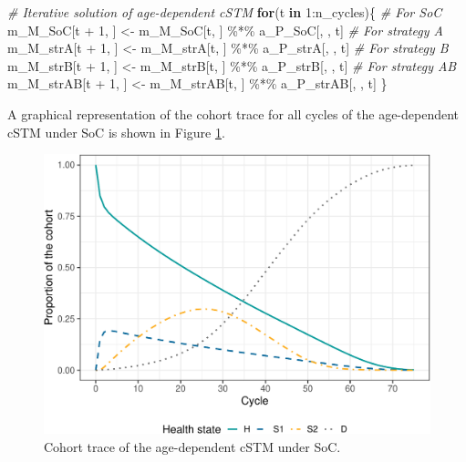 \documentclass[
]{article}
\newenvironment{Shaded}{\begin{snugshade}}{\end{snugshade}}
\newcommand{\CommentTok}[1]{\textcolor[rgb]{0.56,0.35,0.01}{\textit{#1}}}
\newcommand{\ControlFlowTok}[1]{\textcolor[rgb]{0.13,0.29,0.53}{\textbf{#1}}}
\newcommand{\DecValTok}[1]{\textcolor[rgb]{0.00,0.00,0.81}{#1}}
\newcommand{\NormalTok}[1]{#1}
\newcommand{\OtherTok}[1]{\textcolor[rgb]{0.56,0.35,0.01}{#1}}
\newcommand{\SpecialCharTok}[1]{\textcolor[rgb]{0.00,0.00,0.00}{#1}}
\begin{document}
\begin{Shaded}
\begin{Highlighting}[]
\CommentTok{\# Iterative solution of age{-}dependent cSTM}
\ControlFlowTok{for}\NormalTok{(t }\ControlFlowTok{in} \DecValTok{1}\SpecialCharTok{:}\NormalTok{n\_cycles)\{}
  \CommentTok{\# For SoC}
\NormalTok{  m\_M\_SoC[t }\SpecialCharTok{+} \DecValTok{1}\NormalTok{, ] }\OtherTok{\textless{}{-}}\NormalTok{ m\_M\_SoC[t, ] }\SpecialCharTok{\%*\%}\NormalTok{ a\_P\_SoC[, , t]}
  \CommentTok{\# For strategy A}
\NormalTok{  m\_M\_strA[t }\SpecialCharTok{+} \DecValTok{1}\NormalTok{, ] }\OtherTok{\textless{}{-}}\NormalTok{ m\_M\_strA[t, ] }\SpecialCharTok{\%*\%}\NormalTok{ a\_P\_strA[, , t]}
  \CommentTok{\# For strategy B}
\NormalTok{  m\_M\_strB[t }\SpecialCharTok{+} \DecValTok{1}\NormalTok{, ] }\OtherTok{\textless{}{-}}\NormalTok{ m\_M\_strB[t, ] }\SpecialCharTok{\%*\%}\NormalTok{ a\_P\_strB[, , t]}
  \CommentTok{\# For strategy AB}
\NormalTok{  m\_M\_strAB[t }\SpecialCharTok{+} \DecValTok{1}\NormalTok{, ] }\OtherTok{\textless{}{-}}\NormalTok{ m\_M\_strAB[t, ] }\SpecialCharTok{\%*\%}\NormalTok{ a\_P\_strAB[, , t]}
\NormalTok{\}}
\end{Highlighting}
\end{Shaded}

A graphical representation of the cohort trace for all cycles of the age-dependent cSTM under SoC is shown in Figure \ref{fig:Sick-Sicker-Trace-AgeDep}.

\begin{figure}[H]

{\centering \includegraphics{figs/Sick-Sicker-Trace-AgeDep-1} 

}

\caption{Cohort trace of the age-dependent cSTM under SoC.}\label{fig:Sick-Sicker-Trace-AgeDep}
\end{figure}
\end{document}
